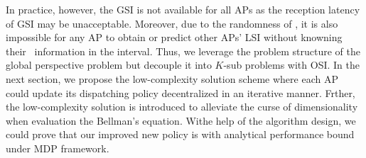 In practice, however, the GSI is not available for all APs as the reception latency of GSI may be unacceptable.
Moreover, due to the randomness of \brlatency, it is also impossible for any AP to obtain or predict other APs' LSI without knowning their \brlatency~information in the interval.
Thus, we leverage the problem structure of the global perspective problem but decouple it into $K$-sub problems
with OSI.
In the next section, we propose the low-complexity solution scheme where each AP could update its dispatching policy decentralized in an iterative manner.
Frther, the low-complexity solution is introduced to alleviate the curse of dimensionality when evaluation the Bellman's equation.
Withe help of the algorithm design, we could prove that our improved new policy is with analytical performance bound under MDP framework.

